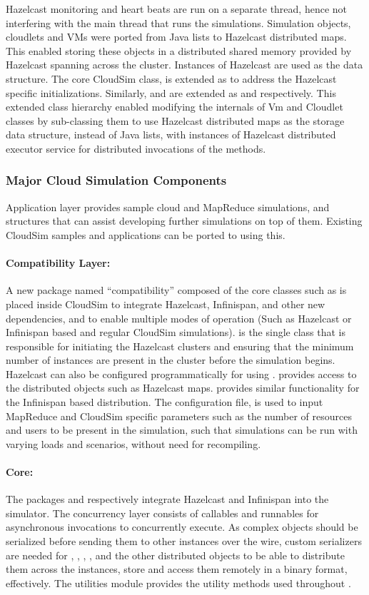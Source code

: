 Hazelcast monitoring and heart beats are run on a separate thread, hence not interfering with the main thread that runs the simulations. Simulation objects, cloudlets and VMs were ported from Java lists to Hazelcast distributed maps. This enabled storing these objects in a distributed shared memory provided by Hazelcast spanning across the cluster. Instances of Hazelcast  are used as the data structure. The core CloudSim class,  is extended as  to address the Hazelcast specific initializations. Similarly,  and  are extended as  and  respectively. This extended class hierarchy enabled modifying the internals of Vm and Cloudlet classes by sub-classing them to use Hazelcast distributed maps as the storage data structure, instead of Java lists, with instances of Hazelcast distributed executor service for distributed invocations of the methods. 

\subsubsection{Major Cloud Simulation Components}
Application layer provides sample cloud and MapReduce simulations, and structures that can assist developing further simulations on top of them. Existing CloudSim samples and applications can be ported to  using this. 

\paragraph*{Compatibility Layer:}
A new package named ``compatibility'' composed of the core classes such as  is placed inside CloudSim to integrate Hazelcast, Infinispan, and other new dependencies, and to enable multiple modes of operation (Such as Hazelcast or Infinispan based and regular CloudSim simulations).  is the single class that is responsible for initiating the Hazelcast clusters and ensuring that the minimum number of instances are present in the cluster before the simulation begins. Hazelcast can also be configured programmatically for  using .  provides access to the distributed objects such as Hazelcast maps.  provides similar functionality for the Infinispan based distribution. The configuration file,  is used to input MapReduce and CloudSim specific parameters such as the number of resources and users to be present in the simulation, such that simulations can be run with varying loads and scenarios, without need for recompiling.

\paragraph*{ Core:}
The packages  and  respectively integrate Hazelcast and Infinispan into the simulator. The concurrency layer consists of callables and runnables for asynchronous invocations to concurrently execute. As complex objects should be serialized before sending them to other instances over the wire, custom serializers are needed for , , , , and the other distributed objects to be able to distribute them across the instances, store and access them remotely in a binary format, effectively. The utilities module provides the utility methods used throughout .

